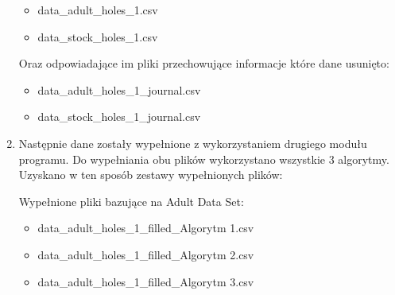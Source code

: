 \documentclass[12pt,twoside]{article}
\begin{document}
\begin{enumerate}[label=\arabic*), leftmargin=1.25cm]
          \begin{itemize}[label=-,labelsep=0.4cm, leftmargin=1.25cm]
              \item data\_adult\_holes\_1.csv
              \item data\_stock\_holes\_1.csv
          \end{itemize}

          Oraz odpowiadające im pliki przechowujące informacje które dane usunięto:

          \begin{itemize}[label=-,labelsep=0.4cm, leftmargin=1.25cm]
              \item data\_adult\_holes\_1\_journal.csv
              \item data\_stock\_holes\_1\_journal.csv
          \end{itemize}
    \item Następnie dane zostały wypełnione z wykorzystaniem drugiego modułu programu.
          Do wypełniania obu plików wykorzystano wszystkie 3 algorytmy. Uzyskano w ten sposób zestawy wypełnionych plików:

          Wypełnione pliki bazujące na Adult Data Set:
          \begin{itemize}[label=-,labelsep=0.4cm, leftmargin=1.25cm]
              \item data\_adult\_holes\_1\_filled\_Algorytm 1.csv
              \item data\_adult\_holes\_1\_filled\_Algorytm 2.csv
              \item data\_adult\_holes\_1\_filled\_Algorytm 3.csv
          \end{itemize}


\end{enumerate}
\end{document}
